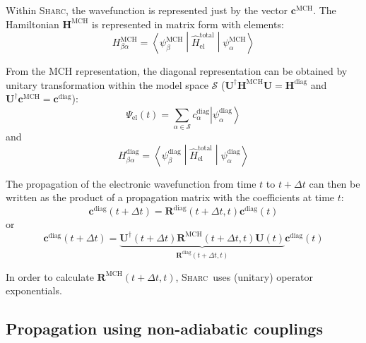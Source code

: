 \documentclass[a4paper,11pt,DIV=15,openany,twoside=false]{scrbook}
\newcommand{\sharc}{\textsc{Sharc}}
\newcommand{\VEC}[1]{\ensuremath{\mathbf{#1}}}
\begin{document}
Within \sharc, the wavefunction is represented just by the vector $\VEC{c}^{\text{MCH}}$. The Hamiltonian $\VEC{H}^{\text{MCH}}$ is represented in matrix form with elements:
\begin{equation}
  H^{\text{MCH}}_{\beta\alpha}=\left\langle\psi^{\text{MCH}}_\beta\middle|\hat{H}_{\text{el}}^{\text{total}}\middle|\psi^{\text{MCH}}_\alpha\right\rangle
\end{equation}

From the MCH representation, the diagonal representation can be obtained by unitary transformation within the model space $\mathcal{S}$ ($\VEC{U}^\dagger\VEC{H}^{\text{MCH}}\VEC{U}=\VEC{H}^{\text{diag}}$ and $\VEC{U}^\dagger\VEC{c}^{\text{MCH}}=\VEC{c}^{\text{diag}}$):
\begin{equation}
  \Psi_{\text{el}}(t)=\sum\limits_{\alpha\in\mathcal{S}} c^{\text{diag}}_\alpha \left|\psi^{\text{diag}}_\alpha\right\rangle
\end{equation}
and
\begin{equation}
  H^{\text{diag}}_{\beta\alpha}=\left\langle\psi^{\text{diag}}_\beta\middle|\hat{H}_{\text{el}}^{\text{total}}\middle|\psi^{\text{diag}}_\alpha\right\rangle
\end{equation}

The propagation of the electronic wavefunction from time $t$ to $t+\Delta t$ can then be written as the product of a propagation matrix with the coefficients at time $t$:
\begin{equation}
  \VEC{c}^{\text{diag}}(t+\Delta t)=\VEC{R}^{\text{diag}}(t+\Delta t,t)\VEC{c}^{\text{diag}}(t)
\end{equation}
or
\begin{equation}
  \VEC{c}^{\text{diag}}(t+\Delta t)=\underbrace{\VEC{U}^\dagger(t+\Delta t)\VEC{R}^{\text{MCH}}(t+\Delta t,t)\VEC{U}(t)}_{\VEC{R}^{\text{diag}}(t+\Delta t,t)}\VEC{c}^{\text{diag}}(t)
\end{equation}

In order to calculate $\VEC{R}^{\text{MCH}}(t+\Delta t,t)$, \sharc\ uses (unitary) operator exponentials. 

\subsection{Propagation using non-adiabatic couplings}
\end{document}
